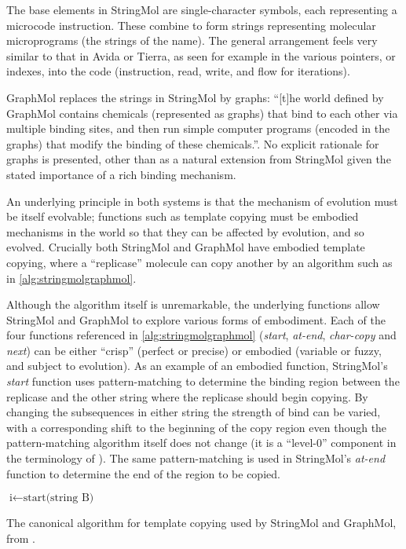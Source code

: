 The base elements in StringMol are single-character symbols, each representing a microcode instruction. These combine to form strings representing molecular microprograms (the strings of the name). The general arrangement feels very similar to that in Avida or Tierra, as seen for example in the various pointers, or indexes, into the code (instruction, read, write, and flow for iterations).

GraphMol replaces the strings in StringMol by graphs: ``[t]he world defined by GraphMol contains chemicals (represented as graphs) that bind to each other via multiple binding sites, and then run simple computer programs (encoded in the graphs) that modify the binding of these chemicals.''. No explicit rationale for graphs is presented, other than as a natural extension from StringMol given the stated importance of a rich binding mechanism. 

An underlying principle in both systems is that the mechanism of evolution must be itself evolvable; functions such as template copying must be embodied mechanisms in the world so that they can be affected by evolution, and so evolved.  Crucially both StringMol and GraphMol have embodied template copying, where a ``replicase'' molecule can copy another by an algorithm such as in \cref{alg:stringmolgraphmol}.

Although the algorithm itself is unremarkable, the underlying functions allow StringMol and GraphMol to explore various forms of embodiment. Each of the four functions referenced in \cref{alg:stringmolgraphmol} (\emph{start}, \emph{at-end}, \emph{char-copy} and \emph{next}) can be either ``crisp'' (\ie perfect or precise) or embodied (variable or fuzzy, and subject to evolution). As an example of an embodied function, StringMol's \emph{start} function uses pattern-matching to determine the binding region between the replicase and the other string where the replicase should begin copying. By changing the subsequences in either string the strength of bind can be varied, with a corresponding shift to the beginning of the copy region even though the pattern-matching algorithm itself does not change (it is a ``level-0'' component in the terminology of \textcite{BanzhafBaumgaertnerBeslonEtAl2016}). The same pattern-matching is used in StringMol's \emph{at-end} function to determine the end of the region to be copied.

\begin{algorithm}[ht]
	$\text{i} \leftarrow \text{start(string B)}$\;
	\caption[The canonical algorithm for template copying used by StringMol and GraphMol]{The canonical algorithm for template copying used by StringMol and GraphMol, from \textcite{Nellis2014}.}
	\label{alg:stringmolgraphmol}
\end{algorithm}

